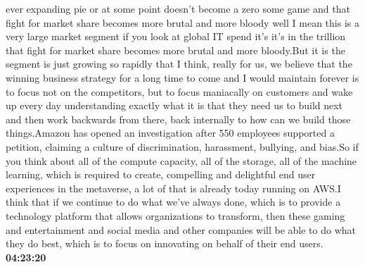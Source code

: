 \documentclass{article}%
\begin{document}
ever expanding pie or at some point doesn't become a zero some game and that fight for market share becomes more brutal and more bloody well I mean this is a very large market segment if you look at global IT spend it's it's in the trillion  that fight for market share becomes more brutal and more bloody.But it is the segment is just growing so rapidly that I think, really for us, we believe that the winning business strategy for a long time to come and I would maintain forever is to focus not on the competitors, but to focus maniacally on customers and wake up every day understanding exactly what it is that they need us to build next and then work backwards from there, back internally to how can we build those things.Amazon has opened an investigation after 550 employees supported a petition, claiming a culture of discrimination, harassment, bullying, and bias.So if you think about all of the compute capacity, all of the storage, all of the machine learning, which is required to create, compelling and delightful end user experiences in the metaverse, a lot of that is already today running on AWS.I think that if we continue to do what we've always done, which is to provide a technology platform that allows organizations to transform, then these gaming and entertainment and social media and other companies will be able to do what they do best, which is to focus on innovating on behalf of their end users.%
\textbf{04:23:20}%
\end{document}

